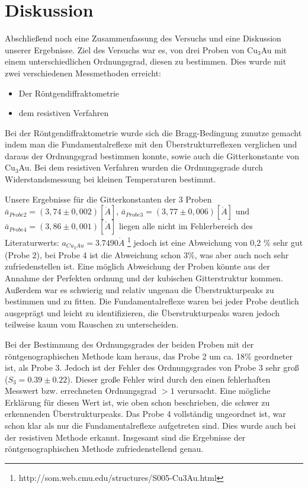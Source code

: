 \section{Diskussion}
    Abschließend noch eine Zusammenfassung des Versuchs und eine Diskussion
    unserer Ergebnisse.
    Ziel des Versuchs war es, von drei Proben von Cu$_3$Au mit einem
    unterschiedlichen Ordnungsgrad, diesen zu bestimmen. 
    Dies wurde mit zwei verschiedenen Messmethoden erreicht: 
    \begin{itemize}
        \item Der Röntgendiffraktometrie
        \item dem resistiven Verfahren
    \end{itemize}
    Bei der Röntgendiffraktometrie wurde sich die Bragg-Bedingung zunutze gemacht
    indem man die Fundamentalreflexe mit den Überstrukturreflexen verglichen und 
    daraus der Ordnungsgrad bestimmen konnte, sowie auch die Gitterkonstante
    von Cu$_3$Au. Bei dem resistiven Verfahren wurden die Ordnungsgrade 
    durch Widerstandsmessung bei kleinen Temperaturen bestimmt.

    Unsere Ergebnisse für die Gitterkonstanten der 3 Proben $\bar{a}_{Probe2} = (3,74 \pm 0,002)[\mathring{A}]$,
    $\bar{a}_{Probe3} = (3,77 \pm 0,006)[\mathring{A}]$ und $\bar{a}_{Probe4} = (3,86 \pm 0,001)[\mathring{A}]$ liegen
    alle nicht im Fehlerbereich des Literaturwerts: $a_{Cu_3Au} = 3.7490\mathring{A}$ \footnote{http://som.web.cmu.edu/structures/S005-Cu3Au.html}
    jedoch ist eine Abweichung von 0,2 \% sehr gut (Probe 2), bei Probe 4 ist die Abweichung schon 3\%, was aber 
    auch noch sehr zufriedenstellen ist. Eine möglich Abweichung der Proben könnte aus der Annahme der Perfekten ordnung und der kubischen Gitterstruktur kommen. Außerdem war es schwierig und relativ ungenau die Überstrukturpeaks zu bestimmen und zu fitten.
    Die Fundamentalreflexe waren bei jeder Probe deutlich ausgeprägt und leicht zu identifizieren, die Überstrukturpeaks 
    waren jedoch teilweise kaum vom Rauschen zu unterscheiden.
    
    Bei der Bestimmung des Ordnungsgrades der beiden Proben mit der röntgenographischen Methode kam heraus, 
    das Probe 2 um ca. 18\% geordneter ist, als Probe 3. Jedoch ist der Fehler des Ordnungsgrades von Probe 3 sehr groß ($S_3= 0.39\pm 0.22$).
    Dieser große Fehler wird durch den einen fehlerhaften Messwert bzw. errechneten Ordnungsgrad $>1$ verursacht.
    Eine mögliche Erklärung für diesen Wert ist, wie oben schon beschrieben, die schwer zu erkennenden Überstrukturpeaks.
    Das Probe 4 vollständig ungeordnet ist, war schon klar als nur die Fundamentalreflexe aufgetreten sind. Dies wurde
    auch bei der resistiven Methode erkannt. Insgesamt sind die Ergebnisse der röntgenographischen Methode
    zufriedenstellend genau.

